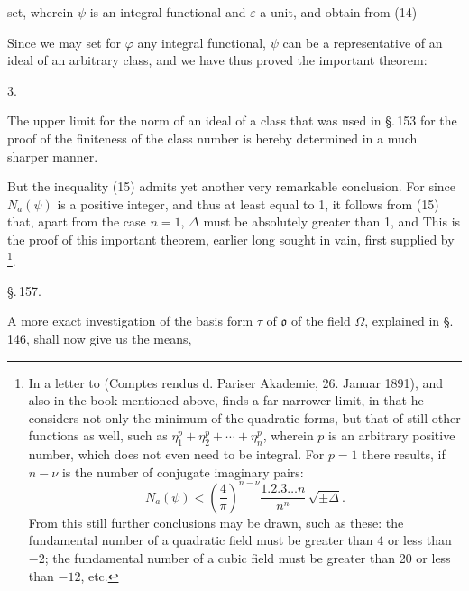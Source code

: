set, wherein $\psi$ is an integral functional and $\varepsilon$ a unit, and
obtain from (14)

Since we may set for $\varphi$ any integral functional, $\psi$ can be
a representative of an ideal of an arbitrary class, and
we have thus proved the important theorem:

3. 

The upper limit for the norm of an ideal of a class that was
used in \S.\,153 for the proof of the finiteness of the class number
is hereby determined in a much sharper manner.

But the inequality (15) admits yet another very remarkable
conclusion. For since $N_a(\psi)$ is a positive integer, and thus
at least equal to 1, it follows from (15)
that, apart from the case $n=1$, $\Delta$ must be absolutely greater than
1, and  This
is the proof of this important theorem, earlier long sought
in vain, first supplied by \footnote{In a letter to  (Comptes rendus d. Pariser Akademie,
26. Januar 1891), and also in the book mentioned above, 
 finds a far narrower limit, in that he considers not only the minimum
of the quadratic forms, but that of still other functions as well,
such as $\eta_1^p + \eta_2^p + \cdots + \eta_n^p$, wherein $p$ is an arbitrary positive number, which
does not even need to be integral. For $p=1$ there results, if $n-\nu$
is the number of conjugate imaginary pairs:
\[ N_a(\psi) < \left(\frac{4}{\pi}\right)^{n-\nu} \frac{1.2.3\ldots n}{n^n}\, \sqrt{\pm \Delta}. \]
From this still further conclusions may be drawn, such as these: the fundamental
 number of a quadratic field must be greater than 4 or less than
$-2$; the fundamental number of a cubic field must be greater than 20
or less than $-12$, etc.}.

\begin{center}
\S.\,157.

\end{center}

A more exact investigation of the basis form $\tau$ of $\mathfrak{o}$ of the
 field $\Omega$, explained in \S.\,146, shall now give us the means,
